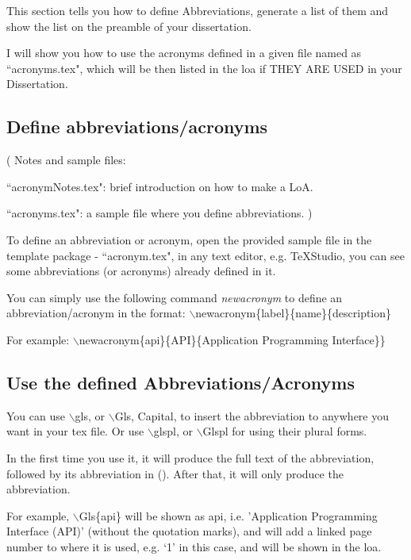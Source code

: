 This section tells you how to define Abbreviations, generate a list of them and show the list on the preamble of your dissertation.
   
I will show you how to use the acronyms defined in a given file named as ``acronyms.tex", which will be then listed in the \gls{loa} if THEY ARE USED in your Dissertation.

\subsection{Define abbreviations/acronyms}

( Notes and sample files:

``acronymNotes.tex": brief introduction on how to make a LoA. 
 
 ``acronyms.tex": a sample file where you define abbreviations.
)

To define an abbreviation or acronym, open the provided sample file in the template package - ``acronym.tex",  in any text editor, e.g. TeXStudio, you can see some abbreviations (or acronyms) already defined in it.

You can simply use the following command \emph{newacronym} to define an abbreviation/acronym 
in the format: $\backslash$newacronym\{label\}\{name\}\{description\}

For example:  
$\backslash$newacronym\{api\}\{API\}\{Application Programming Interface\}\} 
 
\subsection{Use the defined Abbreviations/Acronyms}


You can use $\backslash$gls, or  $\backslash$Gls, Capital, to insert the abbreviation to anywhere you want in your tex file. 
Or use $\backslash$glspl, or  $\backslash$Glspl for using their plural forms. 

In the first time you use it, it will produce the full text of the abbreviation, followed by its abbreviation in (). After that, it will only produce the abbreviation.   

For example,      
$\backslash$Gls\{api\} 
 will be shown as \gls{api}, i.e. 'Application Programming Interface (API)' 
(without the quotation marks), 
and will add a linked page number to where it is used, e.g. `1' in this case, and will be shown in the \gls{loa}. 

